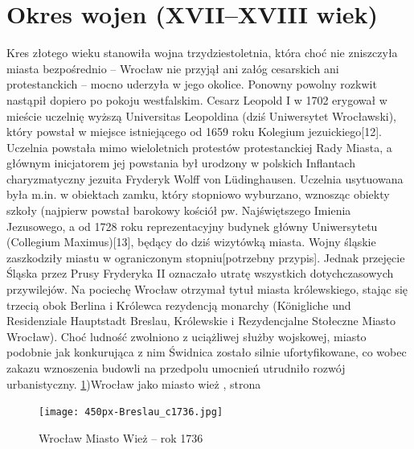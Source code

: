 \documentclass{article}
\begin{document}
\section{Okres wojen (XVII–XVIII wiek)}
\vspace{3mm} %
\newline Kres złotego wieku stanowiła wojna trzydziestoletnia, która choć nie zniszczyła miasta bezpośrednio – Wrocław nie przyjął ani załóg cesarskich ani protestanckich – mocno uderzyła w jego okolice. Ponowny powolny rozkwit nastąpił dopiero po pokoju westfalskim. Cesarz Leopold I w 1702 erygował w mieście uczelnię wyższą Universitas Leopoldina (dziś Uniwersytet Wrocławski), który powstał w miejsce istniejącego od 1659 roku Kolegium jezuickiego[12]. Uczelnia powstała mimo wieloletnich protestów protestanckiej Rady Miasta, a głównym inicjatorem jej powstania był urodzony w polskich Inflantach charyzmatyczny jezuita Fryderyk Wolff von Lüdinghausen. Uczelnia usytuowana była m.in. w obiektach zamku, który stopniowo wyburzano, wznosząc obiekty szkoły (najpierw powstał barokowy kościół pw. Najświętszego Imienia Jezusowego, a od 1728 roku reprezentacyjny budynek główny Uniwersytetu (Collegium Maximus)[13], będący do dziś wizytówką miasta.
\vspace{3mm} %
\newline Wojny śląskie zaszkodziły miastu w ograniczonym stopniu[potrzebny przypis]. Jednak przejęcie Śląska przez Prusy Fryderyka II oznaczało utratę wszystkich dotychczasowych przywilejów. Na pociechę Wrocław otrzymał tytuł miasta królewskiego, stając się trzecią obok Berlina i Królewca rezydencją monarchy (Königliche und Residenziale Hauptstadt Breslau, Królewskie i Rezydencjalne Stołeczne Miasto Wrocław).
\vspace{3mm} %
\newline Choć ludność zwolniono z uciążliwej służby wojskowej, miasto podobnie jak konkurująca z nim Świdnica zostało silnie ufortyfikowane, co wobec zakazu wznoszenia budowli na przedpolu umocnień utrudniło rozwój urbanistyczny.
\newline\ref{fig:Wrcolawmwiez})Wrocław jako miasto wież , strona \pageref{fig:Wrcolawmwiez}
\begin{figure}[h!]
\centering
\texttt{[image: 450px-Breslau\_c1736.jpg]}
\caption{Wrocław Miasto Wież – rok 1736}
\label{fig:Wrcolawmwiez}
\end{figure}
\end{document}
